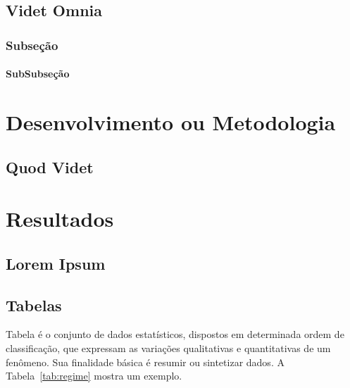 \documentclass[
12pt,        %
openright,   %
twoside,     %
a4paper,     %
english,       %
brazil        %
%
%
]{ppgca}
\begin{document}
\lipsum[8]

\blindtext[8]

\section{Videt Omnia}

\lipsum[9-10]

\subsection{Subseção}

\lipsum[36-38]

\blindtext[3]

\subsubsection{SubSubseção}

\lipsum[41-42]

\blindtext[2]


\chapter{Desenvolvimento ou Metodologia}

\lipsum[16]

\section{Quod Videt} %

\lipsum[3-4]

\chapter{Resultados}

\lipsum[100]

\section{Lorem Ipsum}

\lipsum[5-6]

\section{Tabelas}

Tabela é o conjunto de dados estatísticos, dispostos em determinada
ordem de classificação, que expressam as variações qualitativas e
quantitativas de um fenômeno. Sua finalidade básica é resumir ou
sintetizar dados. A Tabela~\ref{tab:regime} mostra um exemplo.
\end{document}
